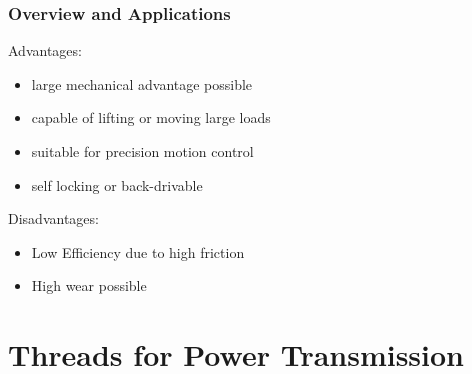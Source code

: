 \documentclass[fleqn]{beamer} %
\newcommand{\sectiontitleI}{Overview and Applications}
\newcommand{\sectiontitleII}{Threads for Power Transmission}
\begin{document}
	\begin{frame}[label=sectionI] \small
		\frametitle{\sectiontitleI}	
		
		Advantages:
		\begin{itemize}
			\item large mechanical advantage possible
			\item capable of lifting or moving large loads 
			\item suitable for precision motion control
			\item self locking or back-drivable 
		\end{itemize}

		Disadvantages:
		\begin{itemize}
			\item Low Efficiency due to high friction
			\item High wear possible	
		\end{itemize}

	\end{frame}







\section{\sectiontitleII}	
\end{document}
